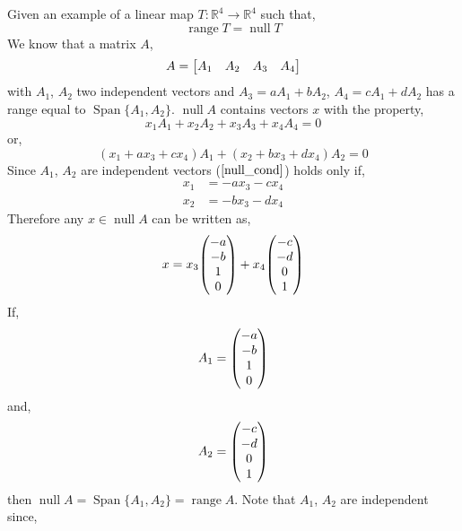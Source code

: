 \documentclass[11pt,a4paper]{scrartcl}
\DeclareMathOperator{\range}{range}
\DeclareMathOperator{\nspace}{null}
\DeclareMathOperator{\Span}{Span}
\newcommand{\RR}{\mathbb{R}}
\newcounter{problem}
\begin{document}
\begin{problem}[3.B.5]
    {%
        Given an example of a linear map $T:\RR^4 \rightarrow \RR^4$ such that,
        \[
        \range T = \nspace T    
        \]
    }
    {%
        We know that a matrix $A$,
        \begin{equation}
        A = 
        \mqty[
        A_1 & A_2 & A_3 & A_4
        ]
        \end{equation}
        with $A_1$, $A_2$ two independent vectors and $A_3=aA_1+bA_2$, $A_4=cA_1+dA_2$ has a range equal to 
        $\Span\{A_1,A_2\}$. $\nspace A$ contains vectors $x$ with the property,
        \begin{equation}
        x_1 A_1 + x_2 A_2 + x_3 A_3 + x_4 A_4 = 0
        \end{equation}  
        or,
        \begin{equation}
        (x_1+ax_3+cx_4) A_1 + (x_2+bx_3+dx_4) A_2  = 0 \label{null_cond}
        \end{equation}  
        Since $A_1$, $A_2$ are independent vectors  ($\ref{null_cond}$) holds only if,
        \begin{align}
        x_1 & = - a x_3 - c x_4 \\
        x_2 & = - b x_3 - d x_4
        \end{align}
        Therefore any $x \in \nspace A$ can be written as,
        \begin{equation}
        x = x_3 \mqty( -a \\ -b \\ 1 \\ 0) +
        x_4 \mqty(-c \\ -d \\ 0 \\ 1)
        \end{equation}  
        If,
        \begin{equation}
        A_1 = \mqty( -a \\ -b \\ 1 \\ 0)
        \end{equation}
        and,
        \begin{equation}
        A_2 = \mqty(-c \\ -d \\ 0 \\ 1)
        \end{equation}
        then $\nspace A=\Span\{A_1,A_2\}=\range A$. Note that $A_1$, $A_2$ are independent since,
        \begin{equation}

\end{equation}}
\end{problem}
\end{document}
